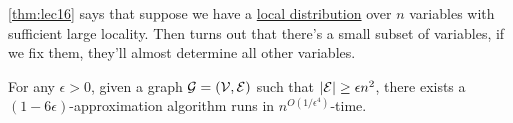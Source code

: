 \begin{remark}
	\autoref{thm:lec16} says that suppose we have a \hyperref[def:local-distribution]{local distribution} over \(n\) variables with sufficient large locality. Then turns out that there's a small subset of variables, if we fix them, they'll almost determine all other variables.
\end{remark}

\begin{theorem}\label{thm:PTAS-for-max-cut}
	For any \(\epsilon >0\), given a graph \(\mathcal{\MakeUppercase{g}} =(\mathcal{\MakeUppercase{v}} , \mathcal{\MakeUppercase{e}} )\) such that \(\left\vert \mathcal{\MakeUppercase{e}}  \right\vert \geq \epsilon n^{2} \), there exists a \((1 - 6\epsilon )\)-approximation algorithm runs in \(n^{O(1 / \epsilon ^4)}\)-time.
\end{theorem}
